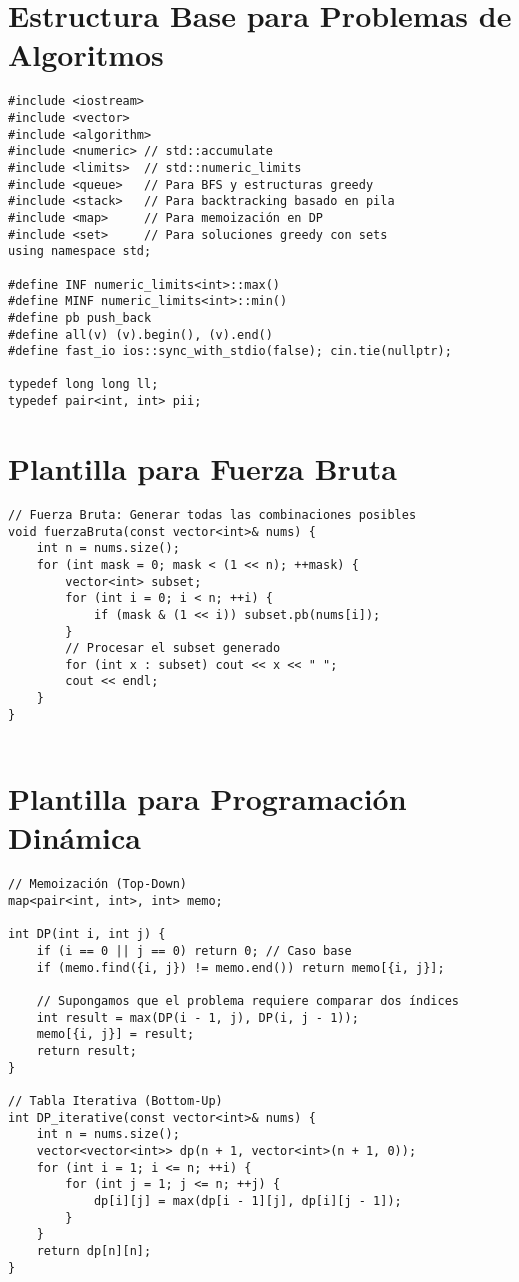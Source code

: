 \section{Estructura Base para Problemas de Algoritmos}

\begin{lstlisting}[style=cpp]
#include <iostream>
#include <vector>
#include <algorithm>
#include <numeric> // std::accumulate
#include <limits>  // std::numeric_limits
#include <queue>   // Para BFS y estructuras greedy
#include <stack>   // Para backtracking basado en pila
#include <map>     // Para memoización en DP
#include <set>     // Para soluciones greedy con sets
using namespace std;

#define INF numeric_limits<int>::max()
#define MINF numeric_limits<int>::min()
#define pb push_back
#define all(v) (v).begin(), (v).end()
#define fast_io ios::sync_with_stdio(false); cin.tie(nullptr);

typedef long long ll;
typedef pair<int, int> pii;

\end{lstlisting}

\newpage
\section{Plantilla para Fuerza Bruta}

\begin{lstlisting}[style=cpp]
// Fuerza Bruta: Generar todas las combinaciones posibles
void fuerzaBruta(const vector<int>& nums) {
    int n = nums.size();
    for (int mask = 0; mask < (1 << n); ++mask) {
        vector<int> subset;
        for (int i = 0; i < n; ++i) {
            if (mask & (1 << i)) subset.pb(nums[i]);
        }
        // Procesar el subset generado
        for (int x : subset) cout << x << " ";
        cout << endl;
    }
}


\end{lstlisting}

\section{Plantilla para Programación Dinámica}

\begin{lstlisting}[style=cpp]
// Memoización (Top-Down)
map<pair<int, int>, int> memo;

int DP(int i, int j) {
    if (i == 0 || j == 0) return 0; // Caso base
    if (memo.find({i, j}) != memo.end()) return memo[{i, j}];
    
    // Supongamos que el problema requiere comparar dos índices
    int result = max(DP(i - 1, j), DP(i, j - 1));
    memo[{i, j}] = result;
    return result;
}

// Tabla Iterativa (Bottom-Up)
int DP_iterative(const vector<int>& nums) {
    int n = nums.size();
    vector<vector<int>> dp(n + 1, vector<int>(n + 1, 0));
    for (int i = 1; i <= n; ++i) {
        for (int j = 1; j <= n; ++j) {
            dp[i][j] = max(dp[i - 1][j], dp[i][j - 1]);
        }
    }
    return dp[n][n];
}


\end{lstlisting}

